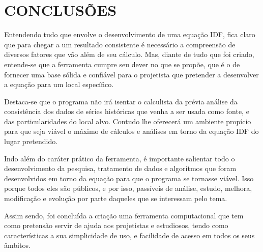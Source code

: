 \chapter{CONCLUSÕES}

Entendendo tudo que envolve o desenvolvimento de uma equação IDF, fica claro que para chegar a um resultado consistente é necessário a compreensão de diversos fatores que vão além de seu cálculo. Mas, diante de tudo que foi criado, entende-se que a ferramenta cumpre seu dever no que se propõe, que é o de fornecer uma base sólida e confiável para o projetista que pretender a desenvolver a equação para um local específico. 

Destaca-se que o programa não irá isentar o calculista da prévia análise da consistência dos dados de séries históricas que venha a ser usada como fonte, e das particularidades do local alvo. Contudo lhe oferecerá um ambiente propício para que seja viável o máximo de cálculos e análises em torno da equação IDF do lugar pretendido.

Indo além do caráter prático da ferramenta, é importante salientar todo o desenvolvimento da pesquisa, tratamento de dados e algoritmos que foram desenvolvidos em torno da equação para que o programa se tornasse viável. Isso porque todos eles são públicos, e por isso, passíveis de análise, estudo, melhora, modificação e evolução por parte daqueles que se interessam pelo tema.

Assim sendo, foi concluída a criação uma ferramenta computacional que tem como pretensão servir de ajuda aos projetistas e estudiosos, tendo como características a sua simplicidade de uso, e facilidade de acesso em todos os seus âmbitos.
